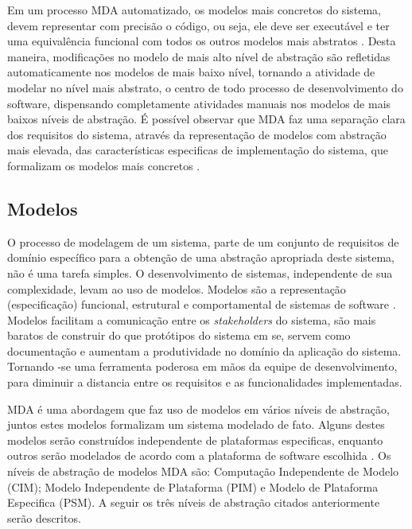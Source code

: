 Em um processo MDA automatizado, os modelos mais concretos do sistema, devem representar com precisão o código, ou seja, ele deve ser executável e ter uma equivalência funcional com todos os outros modelos mais abstratos \cite{miller2003}. Desta maneira, modificações no modelo de mais alto nível de abstração são refletidas automaticamente nos modelos de mais baixo nível, tornando a atividade de modelar no nível mais abstrato, o centro de todo processo de desenvolvimento do software, dispensando completamente atividades manuais nos modelos de mais baixos níveis de abstração. É possível observar que MDA faz uma separação clara dos requisitos do sistema, através da representação de modelos com abstração mais elevada, das características especificas de implementação do sistema, que formalizam os modelos mais concretos \cite{miller2003}.

\subsection{Modelos}


O processo de modelagem de um sistema, parte de um conjunto de requisitos de domínio específico para a obtenção de uma abstração apropriada deste sistema, não é uma tarefa simples. O desenvolvimento de sistemas, independente de sua complexidade, levam ao uso de modelos. Modelos são a representação (especificação) funcional, estrutural e comportamental de sistemas de software \cite{miller2003}. Modelos facilitam a comunicação entre os \textit{stakeholders} do sistema, são mais baratos de construir do que protótipos do sistema em se, servem como documentação e aumentam a produtividade no domínio da aplicação do sistema. Tornando -se uma ferramenta poderosa em mãos da equipe de desenvolvimento, para diminuir a distancia entre os requisitos e as funcionalidades implementadas.

MDA é uma abordagem que faz uso de modelos em vários níveis de abstração, juntos estes modelos formalizam um sistema modelado de fato. Alguns destes modelos serão construídos independente de plataformas especificas, enquanto outros serão modelados de acordo com a plataforma de software escolhida \cite{miller2003}. Os níveis de abstração de modelos MDA são: Computação Independente de Modelo (CIM); Modelo Independente de Plataforma (PIM) e Modelo de Plataforma Especifica (PSM). A seguir os três níveis de abstração citados anteriormente serão descritos.


